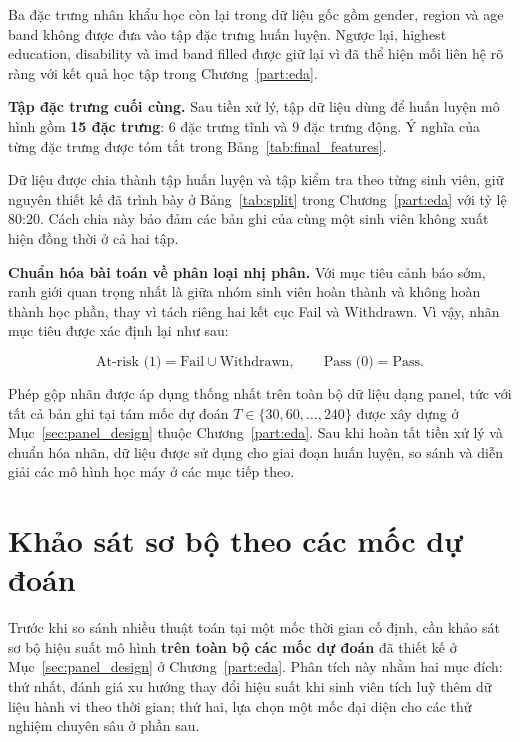 \documentclass[a4paper]{report}
\newcommand{\code}[1]{{\ttfamily\def\_{\textunderscore\discretionary{}{}{}}#1}}
\def\code#1{#1}%
\def\_{ }%
\begin{document}
Ba đặc trưng nhân khẩu học còn lại trong dữ liệu gốc gồm \code{gender},
\code{region} và \code{age\_band} không được đưa vào tập đặc trưng huấn luyện.
Ngược lại, \code{highest\_education}, \code{disability} và
\code{imd\_band\_filled} được giữ lại vì đã thể hiện mối liên hệ rõ ràng với
kết quả học tập trong Chương~\ref{part:eda}.

\textbf{Tập đặc trưng cuối cùng.} Sau tiền xử lý, tập dữ liệu dùng để huấn
luyện mô hình gồm \textbf{15 đặc trưng}: 6 đặc trưng tĩnh và 9 đặc trưng động.
Ý nghĩa của từng đặc trưng được tóm tắt trong Bảng~\ref{tab:final_features}.



Dữ liệu được chia thành tập huấn luyện và tập kiểm tra theo từng sinh viên,
giữ nguyên thiết kế đã trình bày ở Bảng~\ref{tab:split}
trong Chương~\ref{part:eda} với tỷ lệ 80:20. Cách chia này bảo đảm các bản ghi của
cùng một sinh viên không xuất hiện đồng thời ở cả hai tập.

\textbf{Chuẩn hóa bài toán về phân loại nhị phân.} Với mục tiêu cảnh báo sớm,
ranh giới quan trọng nhất là giữa nhóm sinh viên hoàn thành và không hoàn
thành học phần, thay vì tách riêng hai kết cục Fail và Withdrawn. Vì vậy, nhãn
mục tiêu được xác định lại như sau:

\[
  \text{At-risk (1)} = \text{Fail} \cup \text{Withdrawn}, \qquad
  \text{Pass (0)} = \text{Pass}.
\]

Phép gộp nhãn được áp dụng thống nhất trên toàn bộ dữ liệu dạng panel, tức với
tất cả bản ghi tại tám mốc dự đoán
$T \in \{30,60,\ldots,240\}$ được xây dựng ở
Mục~\ref{sec:panel_design} thuộc Chương~\ref{part:eda}. Sau khi hoàn tất tiền xử
lý và chuẩn hóa nhãn, dữ liệu được sử dụng cho giai đoạn huấn luyện, so sánh
và diễn giải các mô hình học máy ở các mục tiếp theo.

\section{Khảo sát sơ bộ theo các mốc dự đoán}
\label{sec:snapshot_survey}

Trước khi so sánh nhiều thuật toán tại một mốc thời gian cố định, cần khảo sát
sơ bộ hiệu suất mô hình \textbf{trên toàn bộ các mốc dự đoán} đã thiết kế ở
Mục~\ref{sec:panel_design} ở Chương~\ref{part:eda}. Phân tích này nhằm hai mục
đích: thứ nhất, đánh giá xu hướng thay đổi hiệu suất khi sinh viên tích luỹ thêm dữ
liệu hành vi theo thời gian; thứ hai, lựa chọn một mốc đại diện cho các thử
nghiệm chuyên sâu ở phần sau.
\end{document}
